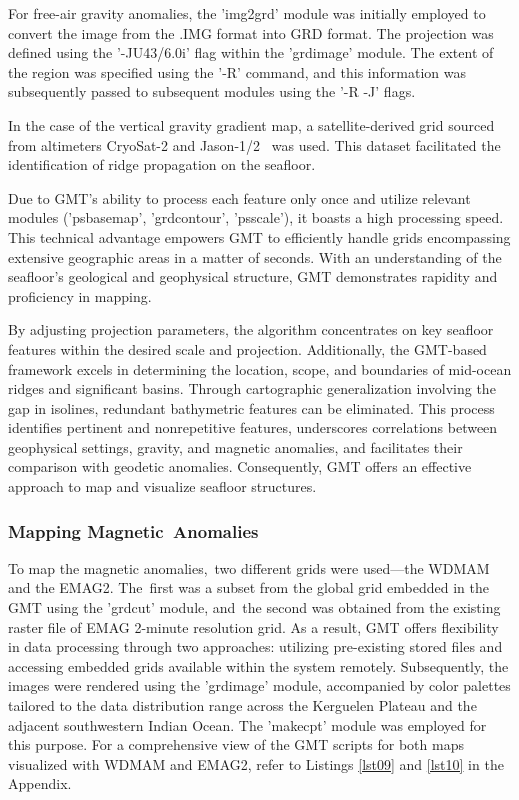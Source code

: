 \documentclass[geomatics,article,accept,pdftex,moreauthors]{Definitions/mdpi}
\begin{document}
For free-air gravity anomalies, the 'img2grd' module was initially employed to convert the image from the .IMG format into GRD format. The projection was defined using the '-JU43/6.0i' flag within the 'grdimage' module. The extent of the region was specified using the '-R' command, and this information was subsequently passed to subsequent modules using the '-R -J' flags.

In the case of the vertical gravity gradient map, a satellite-derived grid sourced from altimeters CryoSat-2 and Jason-1/2~\cite{Harper} was used. This dataset facilitated the identification of ridge propagation on the seafloor.


Due to GMT's ability to process each feature only once and utilize relevant modules ('psbasemap', 'grdcontour', 'psscale'), it boasts a high processing speed. This technical advantage empowers GMT to efficiently handle grids encompassing extensive geographic areas in a matter of seconds. With an understanding of the seafloor's geological and geophysical structure, GMT demonstrates rapidity and proficiency in mapping.

By adjusting projection parameters, the algorithm concentrates on key seafloor features within the desired scale and projection. Additionally, the GMT-based framework excels in determining the location, scope, and boundaries of mid-ocean ridges and significant basins. Through cartographic generalization involving the gap in isolines, redundant bathymetric features can be eliminated. This process identifies pertinent and nonrepetitive features, underscores correlations between geophysical settings, gravity, and magnetic anomalies, and facilitates their comparison with geodetic anomalies. Consequently, GMT offers an effective approach to map and visualize seafloor structures. %

\subsubsection{Mapping Magnetic~Anomalies}

To map the magnetic anomalies,~two different grids were used---the WDMAM and the EMAG2. The~first was a subset from the global grid embedded in the GMT using the 'grdcut' module, and~the second was obtained from the existing raster file of EMAG 2-minute resolution grid. As a result, GMT offers flexibility in data processing through two approaches: utilizing pre-existing stored files and accessing embedded grids available within the system remotely. Subsequently, the images were rendered using the 'grdimage' module, accompanied by color palettes tailored to the data distribution range across the Kerguelen Plateau and the adjacent southwestern Indian Ocean. The 'makecpt' module was employed for this purpose. For a comprehensive view of the GMT scripts for both maps visualized with WDMAM and EMAG2, refer to Listings \ref{lst09} and \ref{lst10} in the Appendix. %
\end{document}

